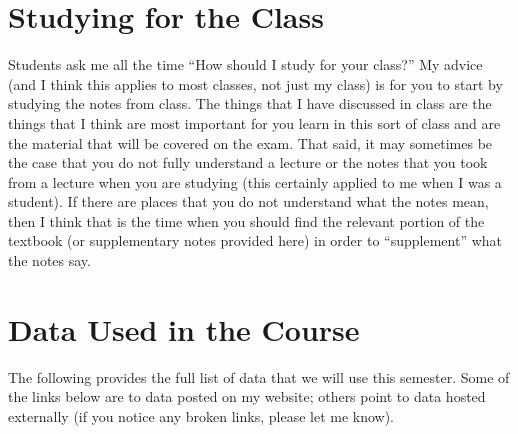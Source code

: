 \documentclass[
  letterpaper,
  DIV=11,
  numbers=noendperiod]{scrreprt}
\begin{document}
\section{Studying for the Class}\label{studying-for-the-class}

Students ask me all the time ``How should I study for your class?'' My
advice (and I think this applies to most classes, not just my class) is
for you to start by studying the notes from class. The things that I
have discussed in class are the things that I think are most important
for you learn in this sort of class and are the material that will be
covered on the exam. That said, it may sometimes be the case that you do
not fully understand a lecture or the notes that you took from a lecture
when you are studying (this certainly applied to me when I was a
student). If there are places that you do not understand what the notes
mean, then I think that is the time when you should find the relevant
portion of the textbook (or supplementary notes provided here) in order
to ``supplement'' what the notes say.

\section{Data Used in the Course}\label{data-used-in-the-course}

The following provides the full list of data that we will use this
semester. Some of the links below are to data posted on my website;
others point to data hosted externally (if you notice any broken links,
please let me know).
\end{document}
